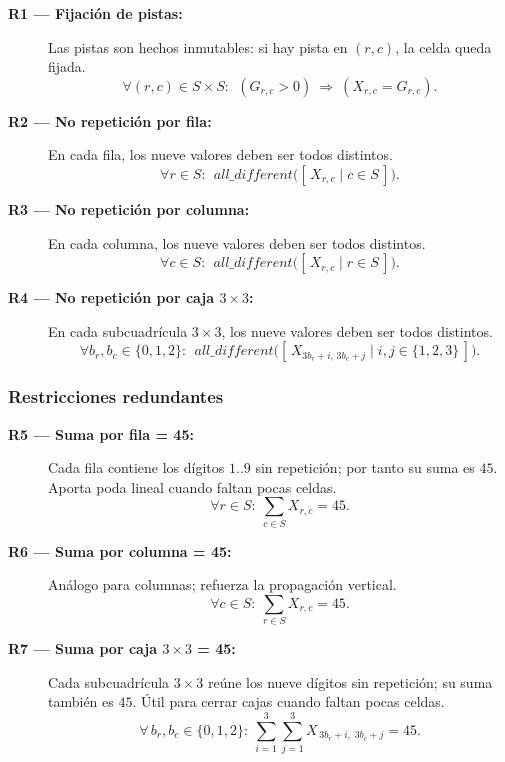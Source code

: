 \begin{description}
  \item[\textbf{R1 — Fijación de pistas:}] Las pistas son hechos inmutables: si hay pista en \((r,c)\), la celda queda fijada.
  \[
    \forall (r,c)\in S\times S:\ \ (G_{r,c}>0)\ \Rightarrow\ (X_{r,c}=G_{r,c}).
  \]

  \item[\textbf{R2 — No repetición por fila:}] En cada fila, los nueve valores deben ser todos distintos.
  \[
    \forall r\in S:\ \ \textit{all\_different}\big([\,X_{r,c}\mid c\in S\,]\big).
  \]

  \item[\textbf{R3 — No repetición por columna:}] En cada columna, los nueve valores deben ser todos distintos.
  \[
    \forall c\in S:\ \ \textit{all\_different}\big([\,X_{r,c}\mid r\in S\,]\big).
  \]

  \item[\textbf{R4 — No repetición por caja \(3\times3\):}] En cada subcuadrícula \(3\times3\), los nueve valores deben ser todos distintos.
  \[
    \forall b_r,b_c\in\{0,1,2\}:\ \
    \textit{all\_different}\big([\,X_{3b_r+i,\,3b_c+j}\mid i,j\in\{1,2,3\}\,]\big).
  \]
\end{description}

\subsubsection*{Restricciones redundantes}

\begin{description}
  \item[\textbf{R5 — Suma por fila = 45:}] Cada fila contiene los dígitos \(1..9\) sin repetición; por tanto su suma es \(45\). Aporta poda lineal cuando faltan pocas celdas.
  \[
    \forall r\in S:\ \sum_{c\in S} X_{r,c}=45.
  \]

  \item[\textbf{R6 — Suma por columna = 45:}] Análogo para columnas; refuerza la propagación vertical.
  \[
    \forall c\in S:\ \sum_{r\in S} X_{r,c}=45.
  \]

  \item[\textbf{R7 — Suma por caja \(3\times3\) = 45:}] Cada subcuadrícula \(3\times3\) reúne los nueve dígitos sin repetición; su suma también es \(45\). Útil para cerrar cajas cuando faltan pocas celdas.
  \[
    \forall\, b_r,b_c\in\{0,1,2\}:\ 
    \sum_{i=1}^{3}\sum_{j=1}^{3} X_{\,3b_r+i,\;3b_c+j} = 45.
  \]
\end{description}

